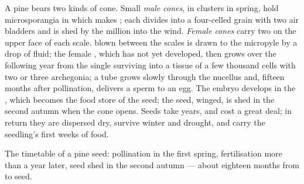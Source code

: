 \begin{proposition}\label{prop:b2:plant-life-cycles:conifer}
A pine bears two kinds of cone. Small \emph{male cones}, in clusters
in spring, hold microsporangia in which  makes ;
each divides into a four-celled  grain with two air bladders
and is shed by the million into the wind. \emph{Female cones} carry
two  on the upper face of each scale.  blown between the
scales is drawn to the micropyle by a drop of fluid; the female
, which has not yet developed, then grows over the
following year from the single surviving  into a tissue of
a few thousand cells with two or three archegonia; a  tube
grows slowly through the nucellus and, fifteen months after
pollination, delivers a sperm to an egg. The embryo develops in the
, which becomes the food store of the seed; the seed,
winged, is shed in the second autumn when the cone opens. Seeds take
years, and cost a great deal; in return they are dispersed dry,
survive winter and drought, and carry the seedling's first weeks
of food.
\end{proposition}

\begin{omfigure}

{\small The timetable of a pine seed: pollination in the first
spring, fertilisation more than a year later, seed shed in the
second autumn --- about eighteen months from  to seed.}
\end{omfigure}

